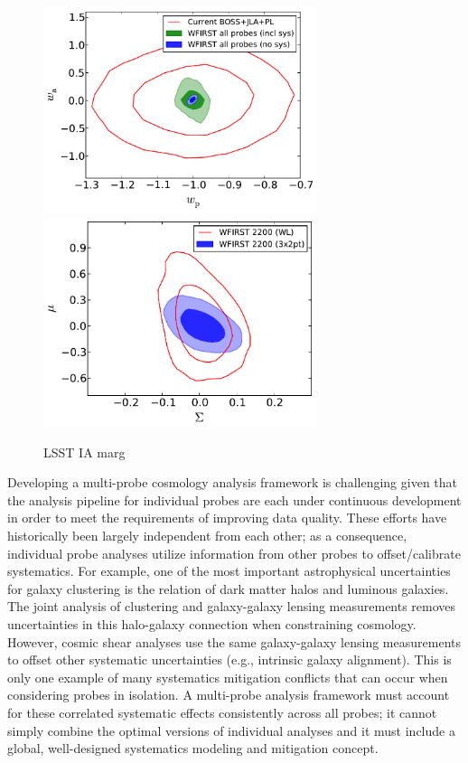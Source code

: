 \begin{figure}
\includegraphics[width=8cm]{Plots/forecasts/WFIRST_multi_probe.pdf}
\includegraphics[width=8cm]{Plots/forecasts/WFIRST_shear_vs_MP.pdf}
\caption{LSST IA marg}
         \label{fi:lsst1}
\end{figure}

Developing a multi-probe cosmology analysis framework is challenging given that the analysis pipeline for individual probes are each under continuous development in order to meet the requirements of improving data quality. These efforts have historically been largely independent from each other; as a consequence, individual probe analyses utilize information from other probes to offset/calibrate systematics. 
For example, one of the most important astrophysical uncertainties for galaxy clustering is the relation of dark matter halos and luminous galaxies. The joint analysis of clustering and galaxy-galaxy lensing measurements removes uncertainties in this halo-galaxy connection when constraining cosmology. However, cosmic shear analyses use the same galaxy-galaxy lensing measurements to offset other systematic uncertainties (e.g., intrinsic galaxy alignment). This is only one example of many systematics mitigation conflicts that can occur when considering probes in isolation.
A multi-probe analysis framework must account for these correlated systematic effects consistently across all probes; it cannot simply combine the optimal versions of individual analyses and it must include a global, well-designed systematics modeling and mitigation concept.
